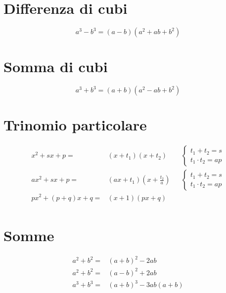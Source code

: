 \section{Differenza di cubi}
\begin{equation*}
a^3-b^3=(a-b)(a^2+ab+b^2)
\end{equation*}
\section{Somma di cubi}
\begin{equation*}
a^3+b^3=(a+b)(a^2-ab+b^2)
\end{equation*}
\section{Trinomio particolare}
\begin{align*}
x^2+sx+p=&(x+t_1)(x+t_2)&&\begin{cases}
t_1+t_2=s\\
t_1\cdot t_2=ap
\end{cases}\\
ax^2+sx+p=&(ax+t_1)(x+\frac{t_2}{a})&&\begin{cases}
t_1+t_2=s\\
t_1\cdot t_2=ap
\end{cases}\\
px^2+(p+q)x+q=&(x+1)(px+q)\\
\end{align*}
\section{Somme}
\begin{align*}
a^2+b^2=&(a+b)^2-2ab\\
a^2+b^2=&(a-b)^2+2ab\\
a^3+b^3=&(a+b)^3-3ab(a+b)\\
\end{align*}
